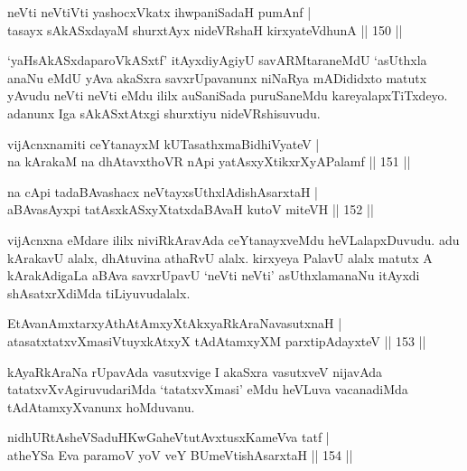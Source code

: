 \begin{shl}
neVti neVtiVti yashocxVkatx ihwpaniSadaH pumAnf |\\
tasayx sAkASxdayaM shurxtAyx nideVRshaH kirxyateV\s dhunA \hfill || 150 ||
\end{shl}

\begin{artha}
`yaHsAkASxdaparoVkASxtf' itAyxdiyAgiyU savARMtaraneMdU `asUthxla anaNu eMdU yAva akaSxra savxrUpavanunx niNaRya mADididxto matutx yAvudu neVti neVti eMdu ililx auSaniSada puruSaneMdu kareyalapxTiTxdeyo. adanunx Iga sAkASxtAtxgi shurxtiyu nideVRshisuvudu.
\end{artha}

\begin{shl}
vijAcnxnamiti ceYtanayxM kUTasathxmaBidhiVyateV |\\
na kArakaM na dhAtavxthoVR nApi yatAsxyXtikxrXyAPalamf \hfill || 151 ||
\end{shl}

\begin{shl}
na cApi tadaBAvashacx neVtayxsUthxlAdishAsarxtaH |\\
aBAvasAyxpi tatAsxkASxyXtatxdaBAvaH kutoV miteVH \hfill || 152 ||
\end{shl}

\begin{artha}
vijAcnxna eMdare ililx niviRkAravAda ceYtanayxveMdu heVLalapxDuvudu. adu kArakavU alalx, dhAtuvina athaRvU alalx. kirxyeya PalavU alalx matutx A kArakAdigaLa aBAva savxrUpavU `neVti neVti' asUthxlamanaNu itAyxdi shAsatxrXdiMda tiLiyuvudalalx.
\end{artha}


\begin{shl}
EtAvanAmxtarxyAthAtAmxyXtAkxyaRkAraNavasutxnaH |\\
atasatxtatxvXmasiVtuyxkAtxyX tAdAtamxyXM parxtipAdayxteV \hfill || 153 ||
\end{shl}

\begin{artha}
kAyaRkAraNa rUpavAda vasutxvige I akaSxra vasutxveV nijavAda tatatxvXvAgiruvudariMda `tatatxvXmasi' eMdu heVLuva vacanadiMda tAdAtamxyXvanunx hoMduvanu.
\end{artha}


\begin{shl}
nidhURtAsheVSaduHKwGaheVtutAvxtusxKameVva tatf |\\
atheYSa Eva paramoV yoV veY BUmeVtishAsarxtaH \hfill || 154 ||
\end{shl}

